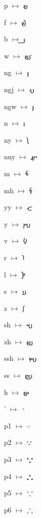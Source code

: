 {\noindent p $\mapsto$ {\avfont 𐬞}\par
\noindent f $\mapsto$ {\avfont 𐬟}\par
\noindent b $\mapsto$ {\avfont 𐬠}\par
\noindent w $\mapsto$ {\avfont 𐬡}\par
\noindent ng $\mapsto$ {\avfont 𐬢}\par
\noindent ngj $\mapsto$ {\avfont 𐬣}\par
\noindent ngw $\mapsto$ {\avfont 𐬤}\par
\noindent n $\mapsto$ {\avfont 𐬥}\par
\noindent ny $\mapsto$ {\avfont 𐬦}\par
\noindent nny $\mapsto$ {\avfont 𐬧}\par
\noindent m $\mapsto$ {\avfont 𐬨}\par
\noindent mh $\mapsto$ {\avfont 𐬩}\par
\noindent yy $\mapsto$ {\avfont 𐬪}\par
\noindent y $\mapsto$ {\avfont 𐬫}\par
\noindent v $\mapsto$ {\avfont 𐬬}\par
\noindent r $\mapsto$ {\avfont 𐬭}\par
\noindent l $\mapsto$ {\avfont 𐬮}\par
\noindent s $\mapsto$ {\avfont 𐬯}\par
\noindent z $\mapsto$ {\avfont 𐬰}\par
\noindent sh $\mapsto$ {\avfont 𐬱}\par
\noindent zh $\mapsto$ {\avfont 𐬲}\par
\noindent ssh $\mapsto$ {\avfont 𐬳}\par
\noindent ss $\mapsto$ {\avfont 𐬴}\par
\noindent h $\mapsto$ {\avfont 𐬵}\par
\noindent ' $\mapsto$ {\avfont 𐬹}\par
\noindent p1 $\mapsto$ {\avfont 𐬺}\par
\noindent p2 $\mapsto$ {\avfont 𐬻}\par
\noindent p3 $\mapsto$ {\avfont 𐬼}\par
\noindent p4 $\mapsto$ {\avfont 𐬽}\par
\noindent p5 $\mapsto$ {\avfont 𐬾}\par
\noindent p6 $\mapsto$ {\avfont 𐬿}\par
}


